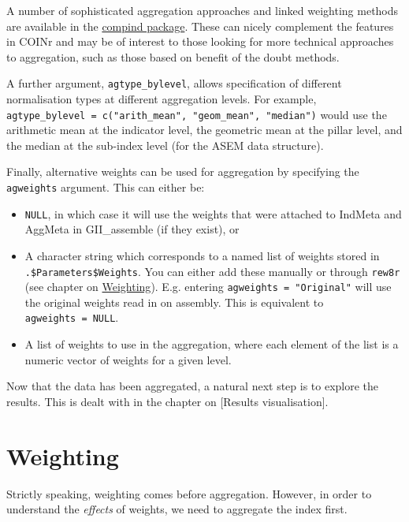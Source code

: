 \documentclass[
]{book}
\providecommand{\tightlist}{%
  \setlength{\itemsep}{0pt}\setlength{\parskip}{0pt}}
\begin{document}
A number of sophisticated aggregation approaches and linked weighting methods are available in the \href{https://cran.r-project.org/web/packages/Compind/index.html}{compind package}. These can nicely complement the features in COINr and may be of interest to those looking for more technical approaches to aggregation, such as those based on benefit of the doubt methods.

A further argument, \texttt{agtype\_bylevel}, allows specification of different normalisation types at different aggregation levels. For example, \texttt{agtype\_bylevel\ =\ c("arith\_mean",\ "geom\_mean",\ "median")} would use the arithmetic mean at the indicator level, the geometric mean at the pillar level, and the median at the sub-index level (for the ASEM data structure).

Finally, alternative weights can be used for aggregation by specifying the \texttt{agweights} argument. This can either be:

\begin{itemize}
\tightlist
\item
  \texttt{NULL}, in which case it will use the weights that were attached to IndMeta and AggMeta in GII\_assemble (if they exist), or
\item
  A character string which corresponds to a named list of weights stored in \texttt{.\$Parameters\$Weights}. You can either add these manually or through \texttt{rew8r} (see chapter on \protect\hyperlink{weighting-2}{Weighting}). E.g. entering \texttt{agweights\ =\ "Original"} will use the original weights read in on assembly. This is equivalent to \texttt{agweights\ =\ NULL}.
\item
  A list of weights to use in the aggregation, where each element of the list is a numeric vector of weights for a given level.
\end{itemize}

Now that the data has been aggregated, a natural next step is to explore the results. This is dealt with in the chapter on {[}Results visualisation{]}.

\hypertarget{weighting-1}{%
\chapter{Weighting}\label{weighting-1}}

Strictly speaking, weighting comes before aggregation. However, in order to understand the \emph{effects} of weights, we need to aggregate the index first.
\end{document}
